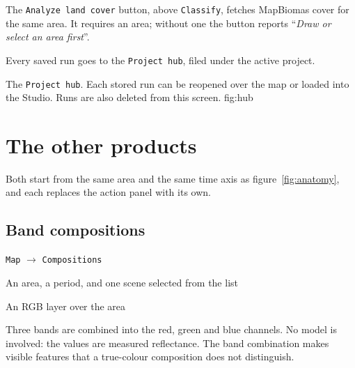 \documentclass[12pt,a4paper]{article}
\newcommand{\msg}[1]{``\textit{#1}''}
\begin{document}
 The \texttt{Analyze land cover} button, above
\texttt{Classify}, fetches MapBiomas cover for the same area. It requires an
area; without one the button reports \msg{Draw or select an area first}.

 Every saved run goes to the \texttt{Project hub},
filed under the active project.

  {The \texttt{Project hub}. Each stored run can be reopened over the map or
   loaded into the Studio. Runs are also deleted from this screen.}
  {fig:hub}

\section{The other products}

Both start from the same area and the same time axis as
figure~\ref{fig:anatomy}, and each replaces the action panel with its own.

\subsection{Band compositions}

\begin{ficha}
  \item[Panel] \texttt{Map} $\rightarrow$ \texttt{Compositions}
  \item[Preconditions] An area, a period, and one scene selected from the list
  \item[Output] An RGB layer over the area
\end{ficha}

Three bands are combined into the red, green and blue channels. No model is
involved: the values are measured reflectance. The band combination makes
visible features that a true-colour composition does not distinguish.
\end{document}
